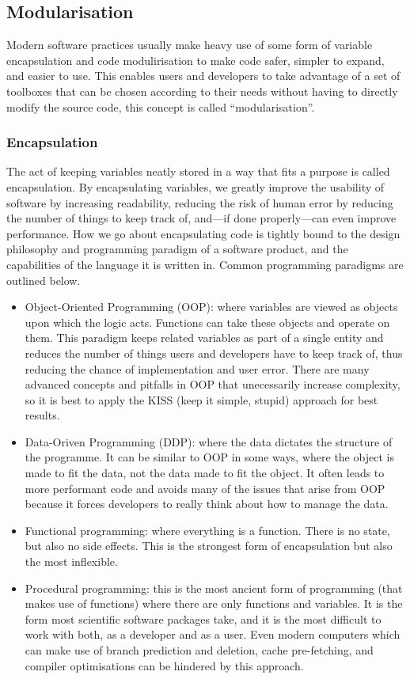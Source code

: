 \subsection{Modularisation}

Modern software practices usually make heavy use of some form of variable encapsulation and code modulirisation to make code safer, simpler to expand, and easier to use. This enables users and developers to take advantage of a set of toolboxes that can be chosen according to their needs without having to directly modify the source code, this concept is called ``modularisation''.

\subsubsection{Encapsulation}\label{ss:encapsulation}

The act of keeping variables neatly stored in a way that fits a purpose is called encapsulation. By encapsulating variables, we greatly improve the usability of software by increasing readability, reducing the risk of human error by reducing the number of things to keep track of, and---if done properly---can even improve performance. How we go about encapsulating code is tightly bound to the design philosophy and programming paradigm of a software product, and the capabilities of the language it is written in. Common programming paradigms are outlined below.
\begin{itemize}
  \item Object-Oriented Programming (OOP): where variables are viewed as objects upon which the logic acts. Functions can take these objects and operate on them. This paradigm keeps related variables as part of a single entity and reduces the number of things users and developers have to keep track of, thus reducing the chance of implementation and user error. There are many advanced concepts and pitfalls in OOP that unecessarily increase complexity, so it is best to apply the KISS (keep it simple, stupid) approach for best results.
  \item Data-Oriven Programming (DDP): where the data dictates the structure of the programme. It can be similar to OOP in some ways, where the object is made to fit the data, not the data made to fit the object. It often leads to more performant code and avoids many of the issues that arise from OOP because it forces developers to really think about how to manage the data.
  \item Functional programming: where everything is a function. There is no state, but also no side effects. This is the strongest form of encapsulation but also the most inflexible.
  \item Procedural programming: this is the most ancient form of programming (that makes use of functions) where there are only functions and variables. It is the form most scientific software packages take, and it is the most difficult to work with both, as a developer and as a user. Even modern computers which can make use of branch prediction and deletion, cache pre-fetching, and compiler optimisations can be hindered by this approach.
\end{itemize}

